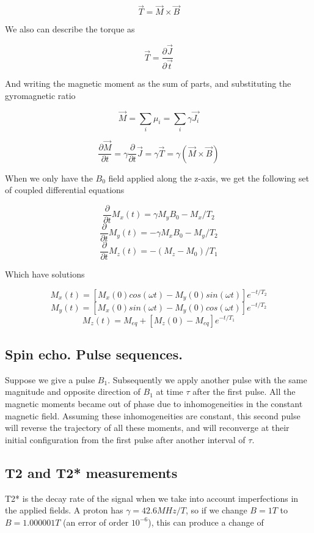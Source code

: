 \documentclass[12pt]{article}
\begin{document}
\[\vec{T} = \vec{M} \times \vec{B}\]

We also can describe the torque as

\[ \vec{T} = \frac{\partial{\vec{J}}}{\partial{\vec{t}}}\]

And writing the magnetic moment as the sum of parts, and substituting the gyromagnetic ratio

\[\vec{M} = \sum_i\mu_i = \sum_i\gamma \vec{J_i}\]

\[ \frac{\partial \vec{M}}{\partial t} = \gamma \frac{\partial}{\partial t}\vec{J} = \gamma \vec{T} = \gamma(\vec{M} \times \vec{B})\]

When we only have the $B_0$ field applied along the z-axis, we get the following set of coupled differential equations

\[ \frac{\partial}{\partial t} M_x(t) = \gamma M_y B_0 - M_x/T_2\]
\[ \frac{\partial}{\partial t} M_y(t) = -\gamma M_x B_0 - M_y/T_2\]
\[ \frac{\partial}{\partial t} M_z(t) = -(M_z - M_0)/T_1\]

Which have solutions

\[M_x(t) = [M_x(0)cos(\omega t) - M_y(0)sin(\omega t)]e^{-t/T_2}\]
\[M_y(t) = [M_x(0)sin(\omega t) - M_y(0)cos(\omega t)]e^{-t/T_2}\]
\[M_z(t) = M_{eq} + [M_z(0) - M_{eq}]e^{-t/T_1}\]




\subsection{Spin echo. Pulse sequences.}

Suppose we give a pulse $B_1$. Subsequently we apply another pulse with the same magnitude and opposite direction of $B_1$ at time $\tau$ after the first pulse. All the magnetic moments became out of phase due to inhomogeneities in the constant magnetic field. Assuming these inhomogeneities are constant, this second pulse will reverse the trajectory of all these moments, and will reconverge at their initial configuration from the first pulse after another interval of $\tau$.

\subsection{T2 and T2* measurements}

T2* is the decay rate of the signal when we take into account imperfections in the applied fields. A proton has $\gamma = 42.6 MHz/T$, so if we change $B= 1T$ to $B = 1.000001T$ (an error of order $10^{-6}$), this can produce a change of
\end{document}
